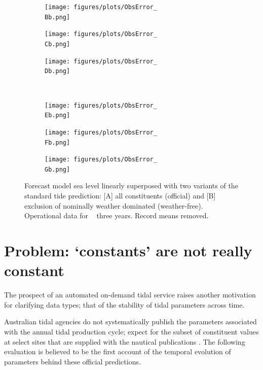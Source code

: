 \begin{figure}[H]\centering
    \begin{subfigure}[b]{\figwidthThird}
        \texttt{[image: figures/plots/ObsError\_\\Bb.png]}\caption{\Bname{}}
    \end{subfigure}
    \begin{subfigure}[b]{\figwidthThird}
        \texttt{[image: figures/plots/ObsError\_\\Cb.png]}\caption{\Cname{}}
    \end{subfigure}
    \begin{subfigure}[b]{\figwidthThird}
        \texttt{[image: figures/plots/ObsError\_\\Db.png]}\caption{\Dname{}}
    \end{subfigure}
    \\
    \begin{subfigure}[b]{\figwidthThird}
        \texttt{[image: figures/plots/ObsError\_\\Eb.png]}\caption{\Ename{}}
    \end{subfigure}
    \begin{subfigure}[b]{\figwidthThird}
        \texttt{[image: figures/plots/ObsError\_\\Fb.png]} \caption{\Fname{}}
    \end{subfigure}
    \begin{subfigure}[b]{\figwidthThird}
        \texttt{[image: figures/plots/ObsError\_\\Gb.png]} \caption{\Gname{}}
    \end{subfigure}
    \caption{Forecast model sea level linearly superposed with two variants of the standard tide prediction: [A] all constituents (official) and [B] exclusion of nominally weather dominated (weather-free).  Operational data for ~ three years. Record means removed. } 
    \label{fig:tideOverlay}
\end{figure}   


\section{Problem: `constants' are not really constant}
\label{Sec:Evolution}
The prospect of an automated on-demand tidal service raises another motivation for clarifying data types; that of the stability of tidal parameters across time.

Australian tidal agencies do not systematically publish the parameters associated with the annual tidal production cycle; expect for the subset of constituent values at select sites that are supplied with the nautical publications \cite{austides}.    The following evaluation is believed to be the first account of the temporal evolution of parameters behind these official predictions.  

